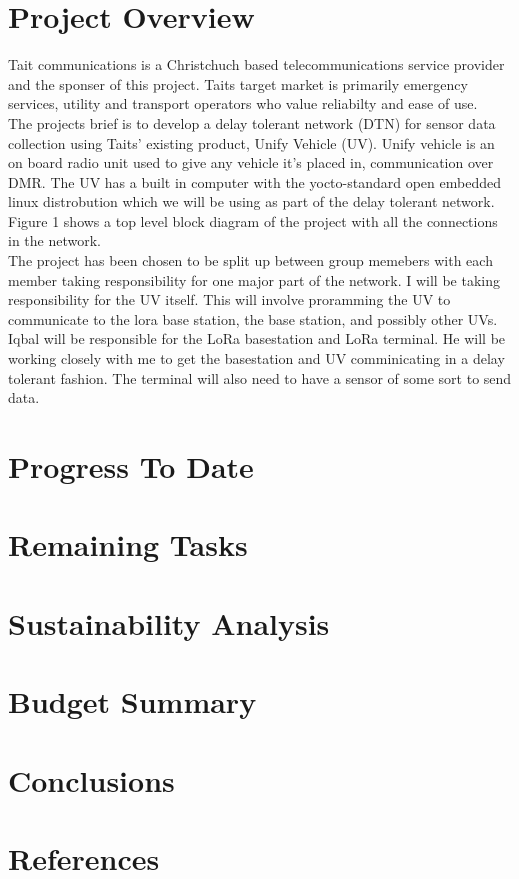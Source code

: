 \documentclass[a4paper,12pt]{article}
\begin{document}
\section{Project Overview}
Tait communications is a Christchuch based telecommunications service provider and the sponser of this project. Taits target market is primarily emergency services, utility and transport operators who value reliabilty and ease of use.\\
The projects brief is to develop a delay tolerant network (DTN) for sensor data collection using Taits' existing product, Unify Vehicle (UV). Unify vehicle is an on board radio unit used to give any vehicle it's placed in, communication over DMR. The UV has a built in computer with the yocto-standard open embedded linux distrobution which we will be using as part of the delay tolerant network. Figure 1 shows a top level block diagram of the project with all the connections in the network.\\
The project has been chosen to be split up between group memebers with each member taking responsibility for one major part of the network. I will be taking responsibility for the UV itself. This will involve proramming the UV to communicate to the lora base station, the base station, and possibly other UVs. Iqbal will be responsible for the LoRa basestation and LoRa terminal. He will be working closely with me to get the basestation and UV comminicating in a delay tolerant fashion. The terminal will also need to have a sensor of some sort to send data.

\clearpage

\section{Progress To Date}

\section{Remaining Tasks}

\section{Sustainability Analysis}

\section{Budget Summary}

\section{Conclusions}

\section{References}
\end{document}
